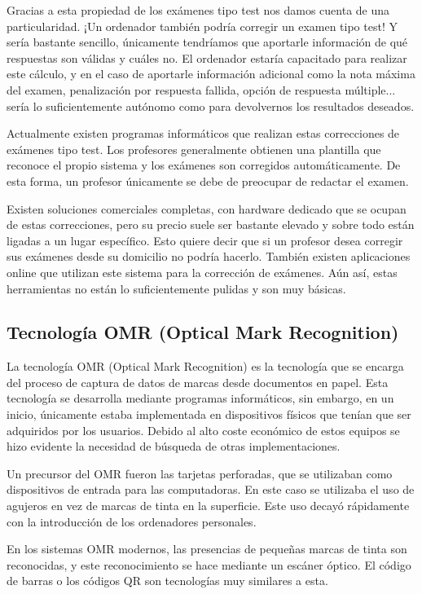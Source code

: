 \documentclass[a4paper, 12pt]{book}
\begin{document}
Gracias a esta propiedad de los exámenes tipo test nos damos cuenta de una
particularidad. ¡Un ordenador también podría corregir un examen tipo test!
Y sería bastante sencillo, únicamente tendríamos que aportarle información
de qué respuestas son válidas y cuáles no. El ordenador estaría capacitado
para realizar este cálculo, y en el caso de aportarle información adicional
como la nota máxima del examen, penalización por respuesta fallida,
opción de respuesta múltiple... sería lo suficientemente autónomo como para
devolvernos los resultados deseados.

Actualmente existen programas informáticos que realizan estas correcciones
de exámenes tipo test. Los profesores generalmente obtienen una plantilla
que reconoce el propio sistema y los exámenes son corregidos automáticamente.
De esta forma, un profesor únicamente se debe de preocupar de redactar el
examen.

Existen soluciones comerciales completas, con hardware dedicado que
se ocupan de estas correcciones, pero su precio
suele ser bastante elevado y sobre todo están ligadas a un lugar específico.
Esto quiere decir que si un profesor desea corregir sus exámenes desde su
domicilio no podría hacerlo. También existen aplicaciones online que
utilizan este sistema para la corrección de exámenes. Aún así, estas
herramientas no están lo suficientemente pulidas y son muy básicas. 

\subsection{Tecnología OMR (Optical Mark Recognition)}
\label{subsec:tecnologia_omr}

La tecnología OMR (Optical Mark Recognition) es la tecnología que se encarga
del proceso de captura de datos de marcas desde documentos en papel. 
Esta tecnología se desarrolla mediante programas informáticos, 
sin embargo, en un inicio,
únicamente estaba implementada en dispositivos físicos que tenían que ser
adquiridos por los usuarios.
Debido al alto coste económico de estos equipos se hizo evidente la
necesidad de búsqueda de otras implementaciones.

Un precursor del OMR fueron las tarjetas perforadas, que se utilizaban como
dispositivos de entrada para las computadoras. En este caso se utilizaba
el uso de agujeros en vez de marcas de tinta en la superficie.
Este uso decayó rápidamente con la introducción de los ordenadores
personales.

En los sistemas OMR modernos, las presencias de pequeñas marcas de tinta son
reconocidas, y este reconocimiento se hace mediante un escáner óptico.
El código de barras o los códigos QR son tecnologías muy similares a esta.
\end{document}
